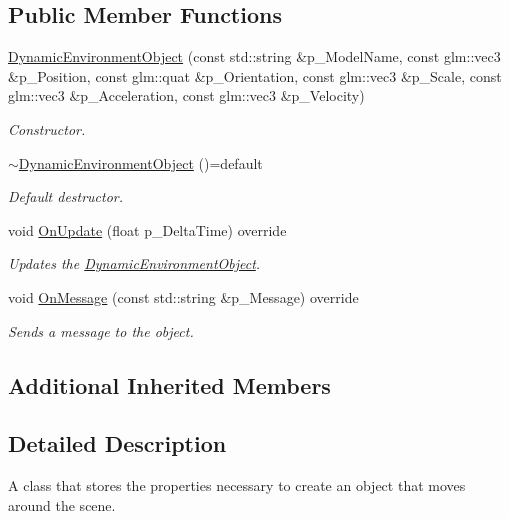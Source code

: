 \subsection*{Public Member Functions}
\begin{DoxyCompactItemize}
\item 
\mbox{\hyperlink{class_dynamic_environment_object_a43f6118b6fe9314af7ca7c841eaf587c}{Dynamic\+Environment\+Object}} (const std\+::string \&p\+\_\+\+Model\+Name, const glm\+::vec3 \&p\+\_\+\+Position, const glm\+::quat \&p\+\_\+\+Orientation, const glm\+::vec3 \&p\+\_\+\+Scale, const glm\+::vec3 \&p\+\_\+\+Acceleration, const glm\+::vec3 \&p\+\_\+\+Velocity)
\begin{DoxyCompactList}\small\item\em Constructor. \end{DoxyCompactList}\item 
\mbox{\label{class_dynamic_environment_object_a183dbae8c8f0f653d9e0d8a1a2691554}} 
\mbox{\hyperlink{class_dynamic_environment_object_a183dbae8c8f0f653d9e0d8a1a2691554}{$\sim$\+Dynamic\+Environment\+Object}} ()=default
\begin{DoxyCompactList}\small\item\em Default destructor. \end{DoxyCompactList}\item 
void \mbox{\hyperlink{class_dynamic_environment_object_a74f519772b818b7f82abec0a70ca59ce}{On\+Update}} (float p\+\_\+\+Delta\+Time) override
\begin{DoxyCompactList}\small\item\em Updates the \mbox{\hyperlink{class_dynamic_environment_object}{Dynamic\+Environment\+Object}}. \end{DoxyCompactList}\item 
void \mbox{\hyperlink{class_dynamic_environment_object_a9803c4f8381f8812976cd016f86aaffd}{On\+Message}} (const std\+::string \&p\+\_\+\+Message) override
\begin{DoxyCompactList}\small\item\em Sends a message to the object. \end{DoxyCompactList}\end{DoxyCompactItemize}
\subsection*{Additional Inherited Members}


\subsection{Detailed Description}
A class that stores the properties necessary to create an object that moves around the scene. 

